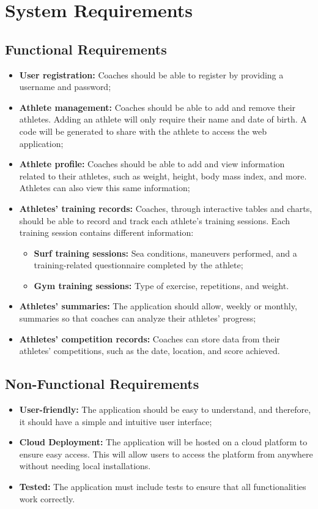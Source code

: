 \documentclass[a4paper,twoside,11pt]{article}
\begin{document}
\section{System Requirements}

\subsection{Functional Requirements}
\begin{itemize}
\item \textbf{User registration:} Coaches should be able to register by providing a username and password;
\item \textbf{Athlete management:} Coaches should be able to add and remove their athletes. Adding an athlete will only require their name and date of birth. A code will be generated to share with the athlete to access the web application;
\item \textbf{Athlete profile:} Coaches should be able to add and view information related to their athletes, such as weight, height, body mass index, and more. Athletes can also view this same information;
\item \textbf{Athletes' training records:} Coaches, through interactive tables and charts, should be able to record and track each athlete's training sessions. Each training session contains different information:
\begin{itemize}
\item \textbf{Surf training sessions:} Sea conditions, maneuvers performed, and a training-related questionnaire completed by the athlete;
\item \textbf{Gym training sessions:} Type of exercise, repetitions, and weight.
\end{itemize}
\item \textbf{Athletes' summaries:} The application should allow, weekly or monthly, summaries so that coaches can analyze their athletes' progress;
\item \textbf{Athletes' competition records:} Coaches can store data from their athletes' competitions, such as the date, location, and score achieved.
\end{itemize}

\subsection{Non-Functional Requirements}
\begin{itemize}
\item \textbf{User-friendly:} The application should be easy to understand, and therefore, it should have a simple and intuitive user interface;
\item \textbf{Cloud Deployment:} The application will be hosted on a cloud platform to ensure easy access. This will allow users to access the platform from anywhere without needing local installations.
\item \textbf{Tested:} The application must include tests to ensure that all functionalities work correctly.
\end{itemize}
\end{document}

